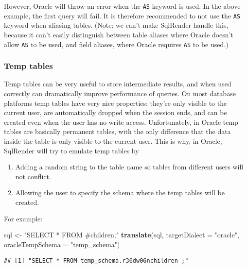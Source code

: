 \documentclass[11pt]{book}
\newenvironment{Shaded}{\begin{snugshade}}{\end{snugshade}}
\newcommand{\DataTypeTok}[1]{\textcolor[rgb]{0.13,0.29,0.53}{#1}}
\newcommand{\KeywordTok}[1]{\textcolor[rgb]{0.13,0.29,0.53}{\textbf{#1}}}
\newcommand{\NormalTok}[1]{#1}
\newcommand{\StringTok}[1]{\textcolor[rgb]{0.31,0.60,0.02}{#1}}
\providecommand{\tightlist}{%
  \setlength{\itemsep}{0pt}\setlength{\parskip}{0pt}}
\theoremstyle{definition}
\theoremstyle{definition}
\theoremstyle{definition}
\theoremstyle{remark}
\begin{document}
However, Oracle will throw an error when the \texttt{AS} keyword is used. In the above example, the first query will fail. It is therefore recommended to not use the \texttt{AS} keyword when aliasing tables. (Note: we can't make SqlRender handle this, because it can't easily distinguish between table aliases where Oracle doesn't allow \texttt{AS} to be used, and field aliases, where Oracle requires \texttt{AS} to be used.)

\hypertarget{temp-tables}{%
\subsubsection*{Temp tables}\label{temp-tables}}

Temp tables can be very useful to store intermediate results, and when used correctly can dramatically improve performance of queries. On most database platforms temp tables have very nice properties: they're only visible to the current user, are automatically dropped when the session ends, and can be created even when the user has no write access. Unfortunately, in Oracle temp tables are basically permanent tables, with the only difference that the data inside the table is only visible to the current user. This is why, in Oracle, SqlRender will try to emulate temp tables by

\begin{enumerate}
\def\labelenumi{\arabic{enumi}.}
\tightlist
\item
  Adding a random string to the table name so tables from different users will not conflict.
\item
  Allowing the user to specify the schema where the temp tables will be created.
\end{enumerate}

For example:

\begin{Shaded}
\begin{Highlighting}[]
\NormalTok{sql <-}\StringTok{ "SELECT * FROM #children;"}
\KeywordTok{translate}\NormalTok{(sql, }\DataTypeTok{targetDialect =} \StringTok{"oracle"}\NormalTok{, }\DataTypeTok{oracleTempSchema =} \StringTok{"temp_schema"}\NormalTok{)}
\end{Highlighting}
\end{Shaded}

\begin{verbatim}
## [1] "SELECT * FROM temp_schema.r36dw06nchildren ;"
\end{verbatim}
\end{document}
